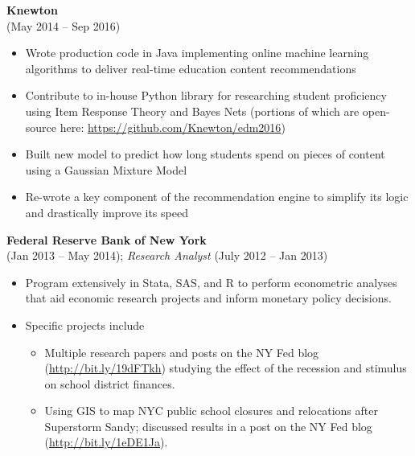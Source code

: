 \documentclass{res}
\begin{document}
\begin{resume}
  {\bf Knewton} \\ 
   (May 2014 -- Sep 2016)
  \begin{itemize} \itemsep 2.0pt %
  \item Wrote production code in Java implementing online machine learning algorithms to deliver real-time education content recommendations
  \item Contribute to in-house Python library for researching student proficiency using Item Response Theory and Bayes Nets (portions of which are open-source here: \href{https://github.com/Knewton/edm2016}{https://github.com/Knewton/edm2016})
  \item Built new model to predict how long students spend on pieces of content using a Gaussian Mixture Model
  \item Re-wrote a key component of the recommendation engine to simplify its logic and drastically improve its speed
    
  \end{itemize}

  {\bf Federal Reserve Bank of New York}  \\
   (Jan 2013 -- May 2014); {\it Research Analyst} (July 2012 -- Jan 2013)
  \begin{itemize} \itemsep 2.0pt %
  \item Program extensively in Stata, SAS, and R to perform econometric analyses that aid economic research projects and inform monetary policy decisions.
  \item Specific projects include
    \setlength{\parskip}{-1.75pt} 
    \begin{itemize}
      \setlength{\itemsep}{1.5pt}
    \item Multiple research papers and posts on the NY Fed blog (\href{http://bit.ly/19dFTkh}{http://bit.ly/19dFTkh}) studying the effect of the recession and stimulus on school district finances.
    \item Using GIS to map NYC public school closures and relocations after Superstorm Sandy; discussed results in a post on the NY Fed blog (\href{http://bit.ly/1eDE1Ja}{http://bit.ly/1eDE1Ja}).
    

\end{itemize}
\end{itemize}
\end{resume}
\end{document}
